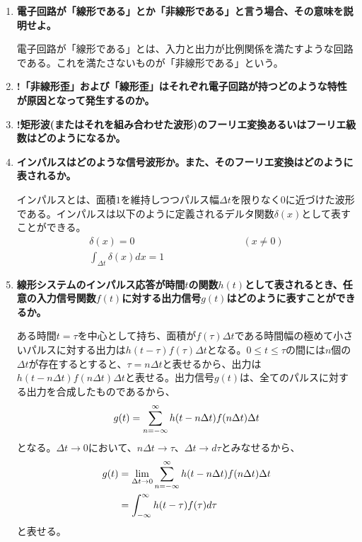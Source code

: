 \documentclass[10pt]{jsarticle}
\begin{document}
\begin{enumerate}
\setlength{\parindent}{1zw}
\setlength{\itemsep}{10pt}
\item\textbf{電子回路が「線形である」とか「非線形である」と言う場合、その意味を説明せよ。}

電子回路が「線形である」とは、入力と出力が比例関係を満たすような回路である。これを満たさないものが「非線形である」という。

\item\textbf{!「非線形歪」および「線形歪」はそれぞれ電子回路が持つどのような特性が原因となって発生するのか。}



\item\textbf{!矩形波(またはそれを組み合わせた波形)のフーリエ変換あるいはフーリエ級数はどのようになるか。}



\item\textbf{インパルスはどのような信号波形か。また、そのフーリエ変換はどのように表されるか。}

インパルスとは、面積$1$を維持しつつパルス幅$\Delta t$を限りなく$0$に近づけた波形である。インパルスは以下のように定義されるデルタ関数$\delta(x)$として表すことができる。
\begin{align}
\delta(x)=0&\hspace{3cm}(x\neq0)\\
\int_{\Delta t} \delta(x) dx = 1&
\end{align}

\item\textbf{線形システムのインパルス応答が時間$t$の関数$h(t)$として表されるとき、任意の入力信号関数$f(t)$に対する出力信号$g(t)$はどのように表すことができるか。}

ある時間$t=\tau$を中心として持ち、面積が$f(\tau)\Delta t$である時間幅の極めて小さいパルスに対する出力は$h(t-\tau)f(\tau)\Delta t$となる。$0 \leq t \leq \tau$の間には$n$個の$\Delta t$が存在するとすると、$\tau=n\Delta t$と表せるから、出力は$h(t-n\Delta t)f(n\Delta t)\Delta t$と表せる。出力信号$g(t)$は、全てのパルスに対する出力を合成したものであるから、
\begin{align}
g(t)=\sum_{n=-\infty}^\infty h(t-n\Delta t)f(n\Delta t)\Delta t\notag
\end{align}
となる。$\Delta t \to 0$において、$n \Delta t \to \tau$、$\Delta t \to d\tau$とみなせるから、
\begin{align}
g(t)&=\lim_{\Delta t \to 0} \sum_{n=-\infty}^\infty h(t-n\Delta t)f(n\Delta t)\Delta t\notag\\
&=\int_{-\infty}^\infty h(t-\tau)f(\tau)d\tau
\end{align}
と表せる。


\end{enumerate}
\end{document}
